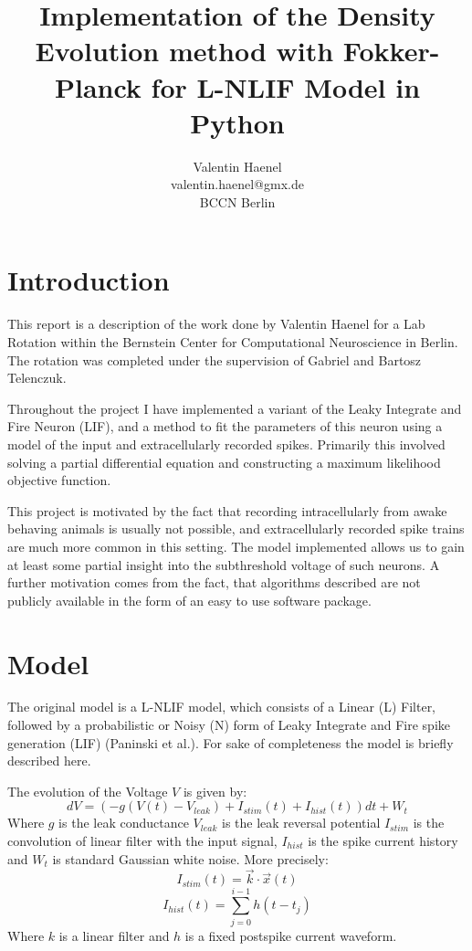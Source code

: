 \documentclass[10pt]{article}
\title{Implementation of the Density Evolution method with
Fokker-Planck for L-NLIF Model in Python}
\author{Valentin Haenel \\
valentin.haenel@gmx.de \\
BCCN Berlin}
\begin{document}
 

\maketitle

\section{Introduction}

This report is a description of the work done by Valentin Haenel
for a Lab Rotation within the Bernstein Center for Computational
Neuroscience in Berlin. The rotation was completed under the
supervision of  Gabriel and Bartosz Telenczuk. 

Throughout the project I have implemented a variant of the Leaky
Integrate and Fire Neuron (LIF), and a method to fit the parameters of this
neuron using a model of the input and extracellularly recorded spikes.
Primarily this involved solving a partial differential equation and constructing
a maximum likelihood objective function. 

This project is motivated by the fact that recording intracellularly from awake
behaving animals is usually not possible, and extracellularly recorded spike
trains are much more common in this setting. The model implemented allows us to
gain at least some partial insight into the subthreshold voltage of such
neurons. A further motivation comes from the fact, that algorithms described are
not publicly available in the form of an easy to use software package. 

\section{Model}
The original model is a L-NLIF model, which consists of a Linear
(L) Filter, followed by a probabilistic or Noisy (N) form of Leaky
Integrate and Fire spike generation (LIF) (Paninski et
al.\cite{PaninskiPillowSimoncelli}). For sake of completeness the
model is briefly described here.

The evolution of the Voltage $V$ is given by:
\begin{equation}
    dV = (-g(V(t) -V_{leak}) +I_{stim}(t) + I_{hist}(t)) dt + W_{t}
\end{equation}
Where $g$ is the leak conductance $V_{leak}$ is the leak reversal
potential $I_{stim}$ is the convolution of linear filter with the
input signal, $I_{hist}$ is the spike current history and $W_t$ is
standard Gaussian white noise. More precisely:
\begin{equation}
    I_{stim}(t) = \vec{k} \cdot  \vec{x}(t) 
\end{equation}
\begin{equation}
    I_{hist}(t) = \sum_{j=0}^{i-1}h(t-t_j)
\end{equation}
Where $k$ is a linear filter and $h$ is a fixed postspike current waveform. 
\end{document}
